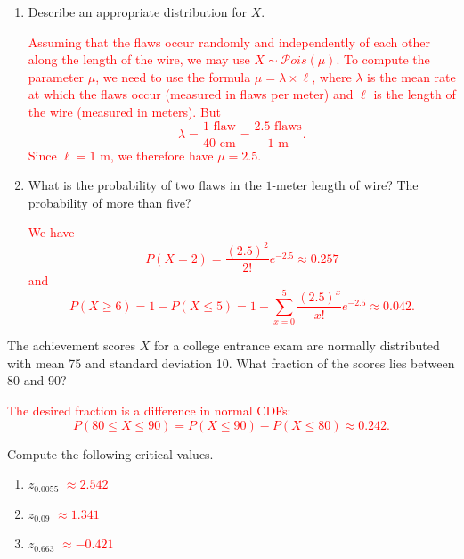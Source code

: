 \documentclass[12pt,reqno]{amsart}
\begin{document}
\medskip
\begin{enumerate}
\item Describe an appropriate distribution for $X$.

\bigskip
\textcolor{red}{Assuming that the flaws occur randomly and independently of each other along the length of the wire, we may use $X\sim \mathcal{P}ois(\mu)$. To compute the parameter $\mu$, we need to use the formula $\mu = \lambda \times \ell$, where $\lambda$ is the mean rate at which the flaws occur (measured in flaws per meter) and $\ell$ is the length of the wire (measured in meters). But
	\[\lambda = \frac{\text{$1$ flaw}}{\text{$40$ cm}} = \frac{\text{2.5 flaws}}{\text{1 m}}.
	\]
Since $\ell=1$ m, we therefore have $\mu = 2.5$.}
\bigskip

\item What is the probability of two flaws in the $1$-meter length of wire? The probability of more than five?

\bigskip
\textcolor{red}{We have
	\[P(X=2) = \frac{(2.5)^2}{2!}e^{-2.5} \approx 0.257
	\]
and
	\[P(X\geq 6) = 1 - P(X\leq 5) = 1 - \sum_{x=0}^5 \frac{(2.5)^x}{x!}e^{-2.5} \approx 0.042.
	\]}
\end{enumerate}












\bigskip
\prob The achievement scores $X$ for a college entrance exam are normally distributed with mean 75 and standard deviation 10. What fraction of the scores lies between 80 and 90?

\bigskip
\textcolor{red}{The desired fraction is a difference in normal CDFs:
	\[P(80 \leq X \leq 90) = P(X\leq 90) - P(X\leq 80) \approx 0.242.
	\]}













\bigskip
\prob Compute the following critical values.

\medskip
\begin{enumerate}
\item $z_{0.0055}$ \textcolor{red}{$\approx 2.542$} 
\item $z_{0.09}$ \textcolor{red}{$\approx 1.341$} 
\item $z_{0.663}$ \textcolor{red}{$\approx -0.421$} 
\end{enumerate}
\end{document}
